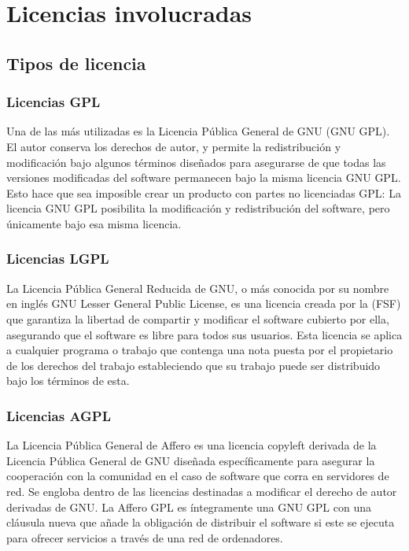 \chapter{Licencias involucradas}\label{ch:licencias}

	\section{Tipos de licencia}\vspace{0.6cm}

			\subsection{Licencias GPL}\label{gpl}
			
				Una de las más utilizadas es la Licencia Pública General de GNU (GNU GPL). El autor conserva los derechos de autor, y permite la redistribución y modificación bajo algunos términos diseñados para asegurarse de que todas las versiones modificadas del software permanecen bajo la misma licencia GNU GPL. Esto hace que sea imposible crear un producto con partes no licenciadas GPL: La licencia GNU GPL posibilita la modificación y redistribución del software, pero únicamente bajo esa misma licencia.\par
	
	
			\subsection{Licencias LGPL}\label{lgpl}
				
				La Licencia Pública General Reducida de GNU, o más conocida por su nombre en inglés GNU Lesser General Public License, es una licencia creada por la (FSF) que garantiza la libertad de compartir y modificar el software cubierto por ella, asegurando que el software es libre para todos sus usuarios. Esta licencia se aplica a cualquier programa o trabajo que contenga una nota puesta por el propietario de los derechos del trabajo estableciendo que su trabajo puede ser distribuido bajo los términos de esta.\par
			
			\subsection{Licencias AGPL}\label{agpl}
			
				La Licencia Pública General de Affero es una licencia copyleft derivada de la Licencia Pública General de GNU diseñada específicamente para asegurar la cooperación con la comunidad en el caso de software que corra en servidores de red. Se engloba dentro de las licencias destinadas a modificar el derecho de autor derivadas de GNU. La Affero GPL es íntegramente una GNU GPL con una cláusula nueva que añade la obligación de distribuir el software si este se ejecuta para ofrecer servicios a través de una red de ordenadores. 
				
